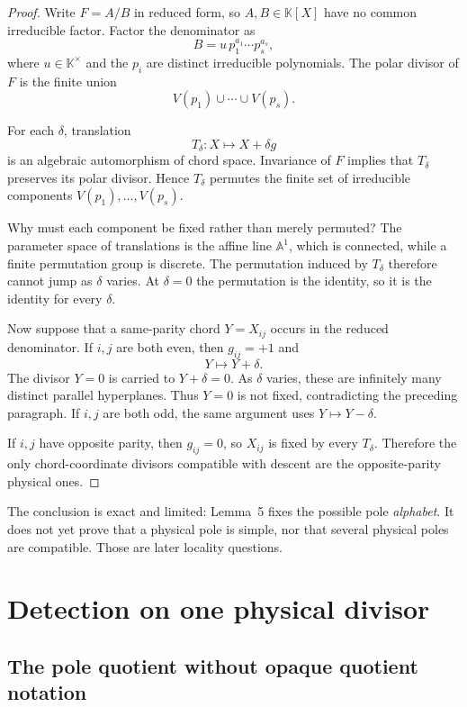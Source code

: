 \documentclass[11pt]{article}
\theoremstyle{definition}
\newcommand{\K}{\mathbb K}
\begin{document}
\begin{proof}
Write $F=A/B$ in reduced form, so $A,B\in\K[X]$ have no common irreducible factor.  Factor the denominator as
\[
B=u\,p_1^{a_1}\cdots p_s^{a_s},
\]
where $u\in\K^\times$ and the $p_i$ are distinct irreducible polynomials.  The polar divisor of $F$ is the finite union
\[
V(p_1)\cup\cdots\cup V(p_s).
\]

For each $\delta$, translation
\[
T_\delta:X\longmapsto X+\delta g
\]
is an algebraic automorphism of chord space.  Invariance of $F$ implies that $T_\delta$ preserves its polar divisor.  Hence $T_\delta$ permutes the finite set of irreducible components $V(p_1),\ldots,V(p_s)$.

Why must each component be fixed rather than merely permuted?  The parameter space of translations is the affine line $\mathbb A^1$, which is connected, while a finite permutation group is discrete.  The permutation induced by $T_\delta$ therefore cannot jump as $\delta$ varies.  At $\delta=0$ the permutation is the identity, so it is the identity for every $\delta$.

Now suppose that a same-parity chord $Y=X_{ij}$ occurs in the reduced denominator.  If $i,j$ are both even, then $g_{ij}=+1$ and
\[
Y\longmapsto Y+\delta.
\]
The divisor $Y=0$ is carried to $Y+\delta=0$.  As $\delta$ varies, these are infinitely many distinct parallel hyperplanes.  Thus $Y=0$ is not fixed, contradicting the preceding paragraph.  If $i,j$ are both odd, the same argument uses $Y\mapsto Y-\delta$.

If $i,j$ have opposite parity, then $g_{ij}=0$, so $X_{ij}$ is fixed by every $T_\delta$.  Therefore the only chord-coordinate divisors compatible with descent are the opposite-parity physical ones.
\end{proof}

The conclusion is exact and limited: Lemma~5 fixes the possible pole \emph{alphabet}.  It does not yet prove that a physical pole is simple, nor that several physical poles are compatible.  Those are later locality questions.

\section{Detection on one physical divisor}

\subsection{The pole quotient without opaque quotient notation}
\end{document}
